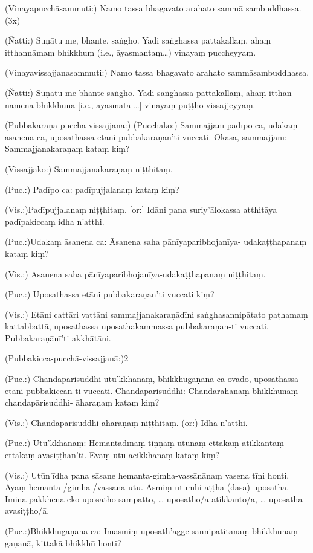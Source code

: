 (Vinayapucchāsammuti:) Namo tassa bhagavato arahato sammā sambuddhassa. (3x)

(Ñatti:) Suṇātu me, bhante, saṅgho. Yadi saṅghassa pattakallaṃ, ahaṃ itthannāmaṃ bhikkhuṃ (i.e., āyasmantaṃ…) vinayaṃ puccheyyaṃ.

(Vinayavissajjanasammuti:) Namo tassa bhagavato arahato sammāsambuddhassa.

(Ñatti:) Suṇātu me bhante saṅgho. Yadi saṅghassa pattakallaṃ, ahaṃ itthan-nāmena bhikkhunā [i.e., āyasmatā …] vinayaṃ puṭṭho vissajjeyyaṃ.

(Pubbakaraṇa-pucchā-vissajjanā:) (Pucchako:) Sammajjanī padīpo ca, udakaṃ āsanena ca,  uposathassa etāni pubbakaraṇan’ti vuccati. Okāsa, sammajjanī: Sammajjanakaraṇaṃ kataṃ kiṃ?

(Vissajjako:) Sammajjanakaraṇaṃ niṭṭhitaṃ.

(Puc.:) Padīpo ca: padīpujjalanaṃ kataṃ kiṃ?

(Vis.:)Padīpujjalanaṃ niṭṭhitaṃ. [or:] Idāni pana suriy'ālokassa atthitāya
padīpakiccaṃ idha n’atthi.

(Puc.:)Udakaṃ āsanena ca: Āsanena saha pānīyaparibhojanīya-
udakaṭṭhapanaṃ kataṃ kiṃ?

(Vis.:) Āsanena saha pānīyaparibhojanīya-udakaṭṭhapanaṃ niṭṭhitaṃ.

(Puc.:) Uposathassa etāni pubbakaraṇan’ti vuccati kiṃ?

(Vis.:) Etāni cattāri vattāni sammajjanakaraṇādīni saṅghasannipātato
paṭhamaṃ kattabbattā, uposathassa uposathakammassa pubbakaraṇan-ti
vuccati. Pubbakaraṇānī'ti akkhātāni.

(Pubbakicca-pucchā-vissajjanā:)2

(Puc.:) Chandapārisuddhi utu'kkhānaṃ, bhikkhugaṇanā ca ovādo,
uposathassa etāni pubbakiccan-ti vuccati.
Chandapārisuddhi: Chandārahānaṃ bhikkhūnaṃ chandapārisuddhi-
āharaṇaṃ kataṃ kiṃ?

(Vis.:) Chandapārisuddhi-āharaṇaṃ niṭṭhitaṃ. (or:) Idha n’atthi.

(Puc.:) Utu'kkhānaṃ: Hemantādīnaṃ tiṇṇaṃ utūnaṃ ettakaṃ
atikkantaṃ ettakaṃ avasiṭṭhan’ti. Evaṃ utu-ācikkhanaṃ kataṃ kiṃ?

(Vis.:) Utūn'īdha pana sāsane hemanta-gimha-vassānānaṃ vasena tīṇi
honti. Ayaṃ hemanta-/gimha-/vassāna-utu. Asmiṃ utumhi aṭṭha (dasa)
uposathā. Iminā pakkhena eko uposatho sampatto, … uposatho/ā
atikkanto/ā, … uposathā avasiṭṭho/ā.

(Puc.:)Bhikkhugaṇanā ca: Imasmiṃ uposath'agge sannipatitānaṃ
bhikkhūnaṃ gaṇanā, kittakā bhikkhū honti?


